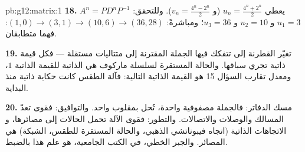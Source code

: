 \begin{solution}{pb:g12:matrix:1}
\textbf{18.} $A^n = P D^n P^{-1}$ يعطي
$u_n = \frac{4^n + 2^n}{2}$ (و
$v_n = \frac{4^n - 2^n}{2}$). وللتحقق: $u_1 = 3$ و $u_2 = 10$
و $u_3 = 36$؛ ومباشرةً: $(1,0) \to (3,1) \to (10,6) \to
(36, 28)$: فهما متطابقان.

\textbf{19.} تغيّر القطرنة  إلى  تتفكك فيها
الجملة المقترنة إلى متتاليات  مستقلة ---
فكل قيمة ذاتية تجري سباقها. والحالة المستقرة لسلسلة ماركوف
هي  الذاتية للقيمة الذاتية $1$، ومعدل
تقارب السؤال 15 هو القيمة الذاتية التالية: فآلة
الطقس كانت حكاية ذاتية منذ البداية.

\textbf{20.} مسك الدفاتر: فالجملة  مصفوفية واحدة،
تُحل بمقلوب واحد. والتوافيق: فقوى 
تعدّ المسالك والوصلات والاتصالات. والتطور: فقوى
الآلة تحمل الحالات إلى مصائرها، و
الاتجاهات الذاتية (اتجاه فيبوناتشي الذهبي، والحالة المستقرة
للطقس،   الشبكة) هي المصائر.
والجبر الخطي، في الكتب الجامعية، هو علم هذا بالضبط.
\end{solution}
